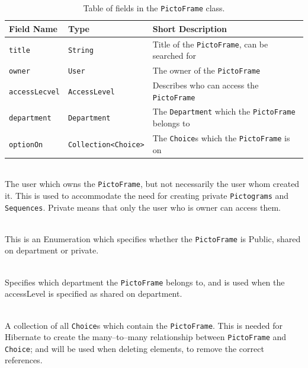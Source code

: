\begin{table}[!h]
    \footnotesize
    \centering
    \begin{tabularx}{\textwidth}{ l l X }
        Field Name    & Type                                & Short Description                                \\
        \midrule
        \texttt{title}        & \texttt{String}       & Title of the \texttt{PictoFrame}, can be searched for\\
        \texttt{owner}        & \texttt{User}         & The owner of the \texttt{PictoFrame}  \\
        \texttt{accessLecvel} & \texttt{AccessLevel}  & Describes who can access the \texttt{PictoFrame} \\
        \texttt{department}   & \texttt{Department}  & The \texttt{Department} which the \texttt{PictoFrame} belongs to\\
        \texttt{optionOn} & \texttt{Collection\textless Choice\textgreater}  & The \texttt{Choice}s which the \texttt{PictoFrame} is on\\
    \end{tabularx}
    \caption{Table of fields in the \texttt{PictoFrame} class.}
    \label{tbl:pictoframe_class}
\end{table}

    \begin{description}[font=\ttfamily\bfseries]
        \item[owner] \hfill \\ The user which owns the \texttt{PictoFrame}, but not necessarily the user whom created it.
        This is used to accommodate the need for creating private \texttt{Pictograms} and \texttt{Sequences}.
        Private means that only the user who is owner can access them.
        \item[accessLevel] \hfill \\ This is an Enumeration which specifies whether the \texttt{PictoFrame} is Public, shared on department or private.
        \item[department] \hfill \\ Specifies which department the \texttt{PictoFrame} belongs to, and is used when the accessLevel is specified as shared on department.
        \item[optionOn] \hfill \\ A collection of all \texttt{Choice}s which contain the \texttt{PictoFrame}.
        This is needed for Hibernate to create the many--to--many relationship between \texttt{PictoFrame} and \texttt{Choice}; and will be used when deleting elements, to remove the correct references.
    \end{description}

